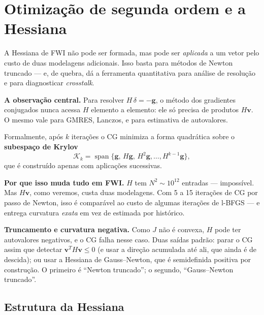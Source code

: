 \documentclass[11pt,a4paper,oneside]{report}
\begin{document}
\chapter{Otimiza\c{c}\~ao de segunda ordem e a Hessiana}
\label{cap:otimizacao}

\begin{ideia}
A Hessiana de FWI n\~ao pode ser formada, mas pode ser \emph{aplicada} a um
vetor pelo custo de duas modelagens adicionais. Isso basta para m\'etodos de
Newton truncado --- e, de quebra, d\'a a ferramenta quantitativa para
an\'alise de resolu\c{c}\~ao e para diagnosticar \emph{crosstalk}.
\end{ideia}

\begin{matematica}
\textbf{A observa\c{c}\~ao central.} Para resolver $H\,\delta = -\mathbf{g}$,
o m\'etodo dos gradientes conjugados nunca acessa $H$ elemento a elemento:
ele s\'o precisa de produtos $H\mathbf{v}$. O mesmo vale para GMRES,
Lanczos, e para estimativa de autovalores.

Formalmente, ap\'os $k$ itera\c{c}\~oes o CG minimiza a forma quadr\'atica
sobre o \textbf{subespa\c{c}o de Krylov}
\[
\mathcal{K}_k = \operatorname{span}\{\mathbf{g},\,H\mathbf{g},\,
H^{2}\mathbf{g},\dots,H^{k-1}\mathbf{g}\},
\]
que \'e constru\'ido apenas com aplica\c{c}\~oes sucessivas.

\textbf{Por que isso muda tudo em FWI.} $H$ tem $N^{2} \sim 10^{12}$
entradas --- imposs\'ivel. Mas $H\mathbf{v}$, como veremos, custa duas
modelagens. Com 5 a 15 itera\c{c}\~oes de CG por passo de Newton, isso \'e
compar\'avel ao custo de algumas itera\c{c}\~oes de l-BFGS --- e entrega
curvatura \emph{exata} em vez de estimada por hist\'orico.

\textbf{Truncamento e curvatura negativa.} Como $J$ n\~ao \'e convexa, $H$
pode ter autovalores negativos, e o CG falha nesse caso. Duas sa\'idas
padr\~ao: parar o CG assim que detectar
$\mathbf{v}^{T}H\mathbf{v} \le 0$ (e usar a dire\c{c}\~ao acumulada at\'e
ali, que ainda \'e de descida); ou usar a Hessiana de Gauss--Newton, que \'e
semidefinida positiva por constru\c{c}\~ao. O primeiro \'e ``Newton truncado'';
o segundo, ``Gauss--Newton truncado''.
\end{matematica}

\section{Estrutura da Hessiana}
\end{document}
